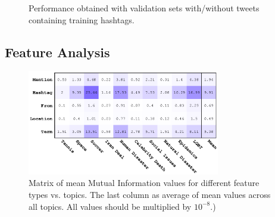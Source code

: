 \begin{figure}[ht]
\begin{centering}
\par\end{centering}
\caption{Performance obtained with validation sets with/without tweets containing training hashtags.}
\end{figure}






\subsection*{Feature Analysis}
\label{label:featureanalysis}


\begin{figure}[t!]
\centering
\includegraphics[width=0.75\textwidth]{images/avgMI_gray}%
\caption{Matrix of mean Mutual Information values for different feature types vs. topics.  The last column as average of mean values across all topics.  All values should be multiplied by $10^{-8}$.)}
\label{fig:avgMI}
\end{figure}

